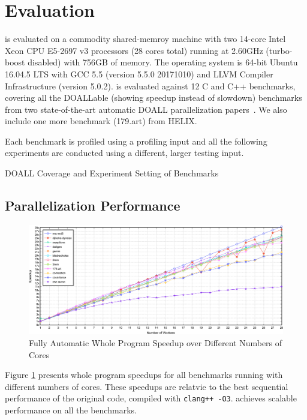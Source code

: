 \section{Evaluation}

\name is evaluated on a commodity shared-memroy machine with two 14-core
Intel Xeon CPU E5-2697 v3 processors (28 cores total) running at 2.60GHz
(turbo-boost disabled) with 756GB of memory. The operating system is 64-bit
Ubuntu 16.04.5 LTS with GCC 5.5 (version 5.5.0 20171010) and LLVM Compiler
Infrastructure (version 5.0.2).
%
\name is evaluated against 12 C and C++ benchmarks, covering all the
DOALLable (showing speedup instead of slowdown) benchmarks from two
state-of-the-art automatic DOALL parallelization
papers~\cite{johnson:12:pldi,kim:12:cgo}. We also include one more
benchmark (179.art) from HELIX.

%
Each benchmark is profiled using a profiling input and all the following
experiments are conducted using a different, larger testing input.

\begin{table}
  
  \caption{
    DOALL Coverage and Experiment Setting of Benchmarks
  }
  \label{tab:benchmark-list}
    \vspace{-5pt}
\end{table}

\subsection{Parallelization Performance}

\begin{figure}[ht]
  \includegraphics[width=\textwidth]{figures/multi-core-crop}
  \caption{Fully Automatic Whole Program Speedup over Different Numbers of Cores}
  \label{fig:multi-core-scale}
\end{figure}

Figure \ref{fig:multi-core-scale} presents whole program speedups for
all benchmarks running with different numbers of cores. These speedups are
relatvie to the best sequential performance of the original code, compiled
with \texttt{clang++ -O3}. \name achieves scalable performance on all the
benchmarks.

